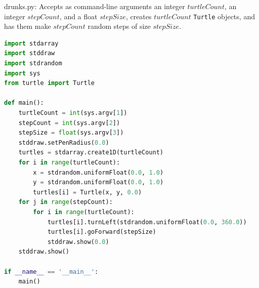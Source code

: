\documentclass[8pt,a4paper,compress,handout]{beamer}
\begin{document}
\begin{frame}[fragile]
\begin{framed}
\tiny drunks.py: Accepts as command-line arguments an integer $turtleCount$, an integer $stepCount$, and a float $stepSize$, creates $turtleCount$ \lstinline{Turtle} objects, and has them make $stepCount$ random steps of size $stepSize$.
\end{framed}

\begin{lstlisting}[language=Python]
import stdarray
import stddraw
import stdrandom
import sys
from turtle import Turtle

def main():
    turtleCount = int(sys.argv[1])
    stepCount = int(sys.argv[2])
    stepSize = float(sys.argv[3])
    stddraw.setPenRadius(0.0)
    turtles = stdarray.create1D(turtleCount)
    for i in range(turtleCount):
        x = stdrandom.uniformFloat(0.0, 1.0)
        y = stdrandom.uniformFloat(0.0, 1.0)
        turtles[i] = Turtle(x, y, 0.0)
    for j in range(stepCount):
        for i in range(turtleCount):
            turtles[i].turnLeft(stdrandom.uniformFloat(0.0, 360.0))
            turtles[i].goForward(stepSize)
            stddraw.show(0.0)
    stddraw.show()
    
if __name__ == '__main__':
    main()
\end{lstlisting}
\end{frame}
\end{document}
